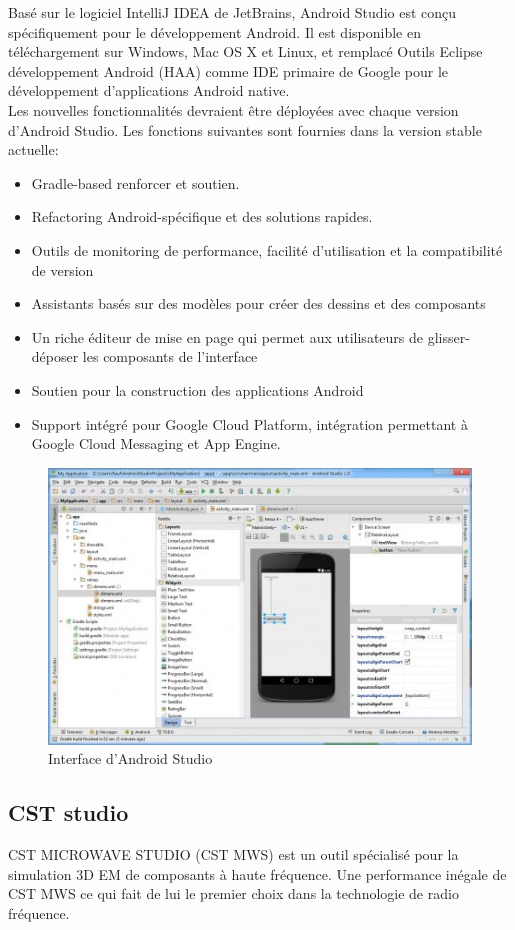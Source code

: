 \documentclass[11pt, a4paper, twoside]{book}
\begin{document}
Basé sur le logiciel IntelliJ IDEA de JetBrains, Android Studio est conçu spécifiquement pour le développement Android. Il est disponible en téléchargement sur Windows, Mac OS X et Linux, et remplacé Outils Eclipse développement Android (HAA) comme IDE primaire de Google pour le développement d'applications Android native.\\


Les nouvelles fonctionnalités devraient être déployées avec chaque version d'Android Studio. Les fonctions suivantes sont fournies dans la version stable actuelle: 
\begin{itemize}
\item Gradle-based  renforcer et soutien.
\item Refactoring Android-spécifique et des solutions rapides.
\item Outils de monitoring de performance, facilité d'utilisation et la compatibilité de version 
\item Assistants basés sur des modèles pour créer des dessins et des composants 
\item Un riche éditeur de mise en page qui permet aux utilisateurs de glisser-déposer les composants de l'interface
\item Soutien pour la construction des applications Android
\item Support intégré pour Google Cloud Platform, intégration permettant à Google Cloud Messaging et App Engine.
\end{itemize}
\begin{figure}[H]
\centering
\includegraphics[width=\textwidth]{as}
\caption{Interface d'Android Studio}
\end{figure}

\subsection{CST studio}
CST MICROWAVE STUDIO (CST MWS) est un outil spécialisé pour la simulation 3D EM de composants à haute fréquence. Une performance inégale de CST MWS  ce qui fait de lui le premier choix dans la technologie de radio fréquence.\\
\end{document}
